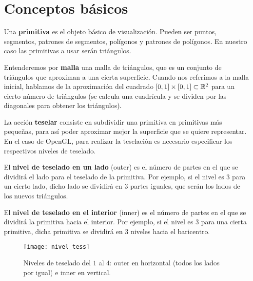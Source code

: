 
\chapter{Conceptos básicos}

\begin{definicion} Una \textbf{primitiva} es el objeto básico de visualización. Pueden ser puntos, segmentos, patrones de segmentos, polígonos y patrones de polígonos. En nuestro caso las primitivas a usar serán triángulos.
\end{definicion}

\begin{definicion} Entenderemos por \textbf{malla} una malla de triángulos, que es un conjunto de triángulos que aproximan a una cierta superficie. Cuando nos referimos a la malla inicial, hablamos de la aproximación del cuadrado $[0,1]\times[0,1]\subset \mathbb{R}^2$ para un cierto número de triángulos (se calcula una cuadrícula y se dividen por las diagonales para obtener los triángulos).
\end{definicion}

\begin{definicion} La acción \textbf{teselar} consiste en subdividir una primitiva en primitivas más pequeñas, para así poder aproximar mejor la superficie que se quiere representar. En el caso de OpenGL, para realizar la teselación es necesario especificar los respectivos niveles de teselado.
\end{definicion}

\begin{definicion} El \textbf{nivel de teselado en un lado} (outer) es el número de partes en el que se dividirá el lado para el teselado de la primitiva. Por ejemplo, si el nivel es $3$ para un cierto lado, dicho lado se dividirá en $3$ partes iguales, que serán los lados de los nuevos triángulos.
\end{definicion}

\begin{definicion} El \textbf{nivel de teselado en el interior} (inner) es el número de partes en el que se dividirá la primitiva hacia el interior. Por ejemplo, si el nivel es $3$ para una cierta primitiva, dicha primitiva se dividirá en $3$ niveles hacia el baricentro.
\end{definicion}

\begin{figure}[h]
  	\centering
  	\texttt{[image: nivel\_tess]}
	\caption{Niveles de teselado del $1$ al $4$: outer en horizontal (todos los lados por igual) e inner en vertical.}
  	\label{fig:nivel_tess}
\end{figure}

